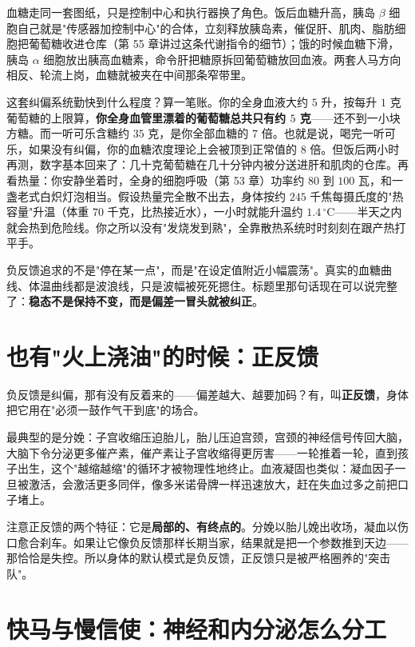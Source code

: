 血糖走同一套图纸，只是控制中心和执行器换了角色。饭后血糖升高，胰岛 $\beta$ 细胞自己就是"传感器加控制中心"的合体，立刻释放胰岛素，催促肝、肌肉、脂肪细胞把葡萄糖收进仓库（第 55 章讲过这条代谢指令的细节）；饿的时候血糖下滑，胰岛 $\alpha$ 细胞放出胰高血糖素，命令肝把糖原拆回葡萄糖放回血液。两套人马方向相反、轮流上岗，血糖就被夹在中间那条窄带里。

\begin{qiaoliang}
这套纠偏系统勤快到什么程度？算一笔账。你的全身血液大约 $5$ 升，按每升 $1$ 克葡萄糖的上限算，\textbf{你全身血管里漂着的葡萄糖总共只有约 $5$ 克}——还不到一小块方糖。而一听可乐含糖约 $35$ 克，是你全部血糖的 $7$ 倍。也就是说，喝完一听可乐，如果没有纠偏，你的血糖浓度理论上会被顶到正常值的 $8$ 倍。但饭后两小时再测，数字基本回来了：几十克葡萄糖在几十分钟内被分送进肝和肌肉的仓库。再看热量：你安静坐着时，全身的细胞呼吸（第 53 章）功率约 $80$ 到 $100$ 瓦，和一盏老式白炽灯泡相当。假设热量完全散不出去，身体按约 $245$ 千焦每摄氏度的"热容量"升温（体重 $70$ 千克，比热接近水），一小时就能升温约 $1.4\,^{\circ}\mathrm{C}$——半天之内就会热到危险线。你之所以没有"发烧发到熟"，全靠散热系统时时刻刻在跟产热打平手。
\end{qiaoliang}

负反馈追求的不是"停在某一点"，而是"在设定值附近小幅震荡"。真实的血糖曲线、体温曲线都是波浪线，只是波幅被死死摁住。标题里那句话现在可以说完整了：\textbf{稳态不是保持不变，而是偏差一冒头就被纠正}。

\section{也有"火上浇油"的时候：正反馈}

负反馈是纠偏，那有没有反着来的——偏差越大、越要加码？有，叫\textbf{正反馈}，身体把它用在"必须一鼓作气干到底"的场合。

最典型的是分娩：子宫收缩压迫胎儿，胎儿压迫宫颈，宫颈的神经信号传回大脑，大脑下令分泌更多催产素，催产素让子宫收缩得更厉害——一轮推着一轮，直到孩子出生，这个"越缩越缩"的循环才被物理性地终止。血液凝固也类似：凝血因子一旦被激活，会激活更多同伴，像多米诺骨牌一样迅速放大，赶在失血过多之前把口子堵上。

注意正反馈的两个特征：它是\textbf{局部的、有终点的}。分娩以胎儿娩出收场，凝血以伤口愈合刹车。如果让它像负反馈那样长期当家，结果就是把一个参数推到天边——那恰恰是失控。所以身体的默认模式是负反馈，正反馈只是被严格圈养的"突击队"。

\section{快马与慢信使：神经和内分泌怎么分工}

